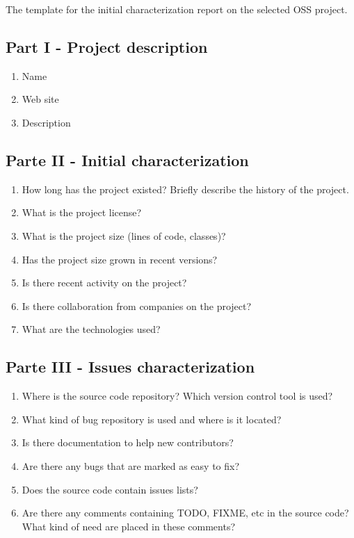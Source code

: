 The template for the initial characterization report on the selected OSS project.

\subsection{Part I - Project description}
\label{part-i-description-of-the-project}

\begin{enumerate}
\def\labelumi{\arabic{enumi}.}
\item
   Name
\item
   Web site
\item
   Description
\end{enumerate}

\subsection{Parte II - Initial characterization}
\label{parte-ii---reconhecimento-inicial}

\begin{enumerate}
\def\labelenumi{\arabic{enumi}.}
\setcounter{enumi}{3}
\item
  How long has the project existed? Briefly describe the history of the project.
\item
  What is the project license?
\item
  What is the project size (lines of code, classes)?
\item
  Has the project size grown in recent versions?
\item
  Is there recent activity on the project?
\item
  Is there collaboration from companies on the project?
\item
  What are the technologies used?
\end{enumerate}

\subsection{Parte III - Issues characterization}
\label{parte-iii---identificauxe7uxe3o-de-tarefas}

\begin{enumerate}
\def\labelenumi{\arabic{enumi}.}
\setcounter{enumi}{10}
\item
  Where is the source code repository? Which version control tool is used?
\item
  What kind of bug repository is used and where is it located?
\item
  Is there documentation to help new contributors?
\item
  Are there any bugs that are marked as easy to fix?
\item
  Does the source code contain issues lists?
\item
  Are there any comments containing TODO, FIXME, etc in the source code? What kind of need are placed in these comments?
\end{enumerate}

